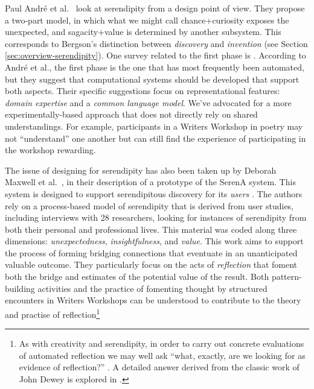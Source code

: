 \documentclass{llncs}
\begin{document}
Paul Andr{\'e} et al.~\cite{andre2009discovery} look at serendipity
from a design point of view.  They propose a two-part model, in which
what we might call chance+curiosity exposes the unexpected, and
sagacity+value is determined by another subsystem.  This corresponds
to Bergson's distinction between \emph{discovery} and \emph{invention}
(see Section \ref{sec:overview-serendipity}).  One survey related to
the first phase is \cite{foster2003serendipity}.  According to Andr\'e
et al., the first phase is the one that has most frequently been
automated, but they suggest that computational systems should be
developed that support both aspects.  Their specific suggestions focus
on representational features: \emph{domain expertise} and a
\emph{common language model}.  We've advocated for a more
experimentally-based approach that does not directly rely on shared
understandings.  For example, participants in a Writers Workshop in
poetry may not ``understand'' one another but can still find the
experience of participating in the workshop rewarding.

The issue of designing for serendipity has also been taken up by
Deborah Maxwell et al.~\cite{maxwell2012designing}, in their
description of a prototype of the SerenA system.  This system is
designed to support serendipitous discovery for its \emph{users}
\cite{forth2013serena}.  The authors rely on a process-based model of
serendipity \cite{Makri2012,Makri2012a} that is derived from user
studies, including interviews with 28 researchers, looking for
instances of serendipity from both their personal and professional
lives.  This material was coded along three dimensions:
\emph{unexpectedness}, \emph{insightfulness}, and \emph{value}.  This
work aims to support the process of forming bridging connections that
eventuate in an unanticipated valuable outcome.  They particularly
focus on the acts of \emph{reflection} that foment both the bridge and
estimates of the potential value of the result.  Both pattern-building
activities and the practice of fomenting thought by structured
encounters in Writers Workshops can be understood to contribute to the
theory and practise of reflection\footnote{As with creativity and
  serendipity, in order to carry out concrete evaluations of automated
  reflection we may well ask ``what, exactly, are we looking for as
  evidence of reflection?'' \cite{rodgers2002defining}.  A detailed
  answer derived from the classic work of John Dewey
  \cite{dewey1997we} is explored in \cite{rodgers2002defining}.}
\end{document}

